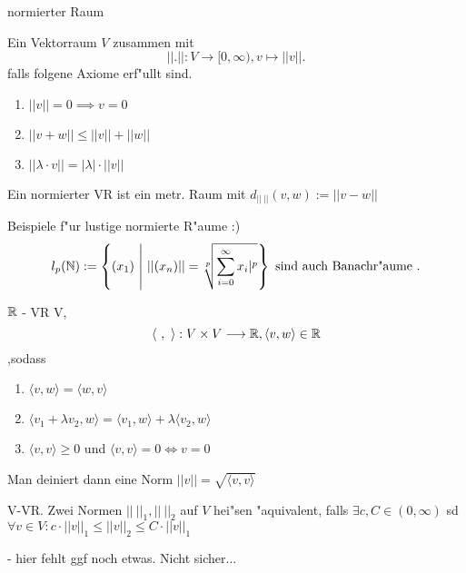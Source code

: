 \documentclass[class=article, crop=false]{standalone}
\begin{document}
\begin{zettel}{normierter Raum}
\begin{flashcard}
    \begin{definition}
        Ein Vektorraum $V$ zusammen mit     
        \[
            || . ||: V \longrightarrow [0, \infty), v \mapsto  ||v||
        .\]
        falls folgene Axiome erf"ullt sind.
        \begin{enumerate}
            \item $||v|| = 0 \implies v = 0 $ 
            \item $||v + w || \leq  ||v|| + ||w||$ 
            \item $||\lambda \cdot v|| = |\lambda | \cdot ||v||$ 
        \end{enumerate}
    \end{definition}
    Ein normierter VR ist ein metr. Raum mit $ d_{ ||\ ||} (v,w) := ||v -w||$ 
\end{flashcard}

\begin{remark}
Beispiele f"ur lustige normierte R"aume :)
\[
    l_p (\mathbb{N}) := \set{ (x_1 )}{ ||(x_n)|| = \sqrt[p]{\sum_{i=0}^{\infty} 
    x_i|^p}  } \text{ sind auch Banachr"aume } 
.\]

\begin{example}
    $\mathbb{R}$ - VR V,
    \[
        \langle \ , \ \rangle : V \times V \longrightarrow \mathbb{R}, \langle v,w\rangle \in  \mathbb{R}
    \] ,sodass 
    \begin{enumerate}
        \item $ \langle v,w\rangle  =  \langle w,v\rangle $ 
        \item $ \langle v_1+\lambda v_2,w\rangle =  \langle v_1 ,w\rangle  + \lambda \langle v_2,w\rangle $ 
        \item $ \langle v,v\rangle \geq 0$ und $ \langle v,v\rangle = 0 \iff  v = 0$ 
        
    \end{enumerate}
    Man deiniert dann eine Norm $||v|| = \sqrt{ \langle v,v\rangle }$ 
        
\end{example}
\end{remark}

\begin{definition}
    V-VR. Zwei Normen $||\ ||_1, ||\ ||_2 $ auf $V$ hei"sen "aquivalent, falls $\exists c, C \in  (0,\infty) $ sd
    $\forall  v \in  V : c \cdot  ||v||_1 \leq ||v||_2 \leq C \cdot ||v||_1$ 

    - hier fehlt ggf noch etwas. Nicht sicher...
\end{definition}
\end{zettel}
\end{document}
